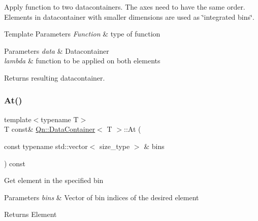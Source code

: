 Apply function to two datacontainers. The axes need to have the same order. Elements in datacontainer with smaller dimensions are used as \char`\"{}integrated bins\char`\"{}. 
\begin{DoxyTemplParams}{Template Parameters}
{\em Function} & type of function \\
\hline
\end{DoxyTemplParams}

\begin{DoxyParams}{Parameters}
{\em data} & Datacontainer \\
\hline
{\em lambda} & function to be applied on both elements \\
\hline
\end{DoxyParams}
\begin{DoxyReturn}{Returns}
resulting datacontainer. 
\end{DoxyReturn}
\mbox{\label{classQn_1_1DataContainer_a637662b4443d60c9aab35a906ee98877}} 
\subsubsection{\texorpdfstring{At()}{At()}\hspace{0.1cm}{\footnotesize\ttfamily [1/4]}}
{\footnotesize\ttfamily template$<$typename T$>$ \\
T const\& \mbox{\hyperlink{classQn_1_1DataContainer}{Qn\+::\+Data\+Container}}$<$ T $>$\+::At (\begin{DoxyParamCaption}\item[{const typename std\+::vector$<$ size\+\_\+type $>$ \&}]{bins }\end{DoxyParamCaption}) const\hspace{0.3cm}{\ttfamily [inline]}}

Get element in the specified bin 
\begin{DoxyParams}{Parameters}
{\em bins} & Vector of bin indices of the desired element \\
\hline
\end{DoxyParams}
\begin{DoxyReturn}{Returns}
Element 
\end{DoxyReturn}
\mbox{\label{classQn_1_1DataContainer_af1565f4febc1125cac6e1fed8398f38f}} 
